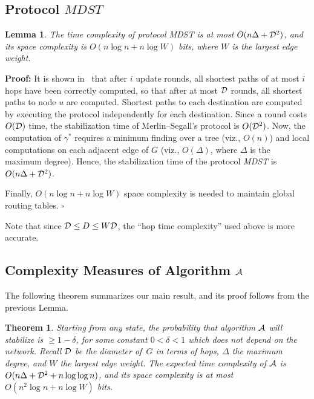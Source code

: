 \documentclass[10pt]{article}
\newtheorem{thm}{Theorem}[section]
\newtheorem{lemm}{Lemma}[section]
\newenvironment{proof}{\begin{trivlist}
                       \item[]\hspace{0cm}\textbf{Proof: }
                       \hspace{0cm} }{\hfill $\square$
                       \end{trivlist}}
\begin{document}
\subsection{Protocol $MDST$}\label{mdstcomp}

\begin{lemm}\label{lem:mdstc}
The time complexity of protocol MDST is at most
$O(n\Delta+{\cal D}^2)$, and its space complexity is
$O(n\log n + n\log W)$ bits, where $W$ is the largest edge weight.
\end{lemm}

\begin{proof}
It is shown in~\cite{MeSe79} that after $i$ update
rounds, all shortest paths of at most $i$ hops have been correctly
computed, so that after at most $\cal D$ rounds, all shortest paths to
node $u$ are computed.  Shortest paths to each destination are
computed by executing the protocol independently for each destination.
Since a round costs $O({\cal D})$ time, the stabilization time of
Merlin--Segall's protocol is $O({\cal D}^2)$.  Now, the computation of
$\gamma^*$ requires a minimum finding over a tree (viz., $O(n)$) and
local computations on each adjacent edge of $G$ (viz., $O(\Delta)$,
where $\Delta$ is the maximum degree). Hence, the stabilization time
of the protocol {\em MDST} is $O(n\Delta + {\cal D}^2)$.

Finally, $O(n\log n + n\log W)$ space complexity is needed to maintain
global routing tables.
\end{proof}
Note that since ${\cal D} \leq D \leq W {\cal D}$, the ``hop time complexity''
used above is more accurate.

\subsection{Complexity Measures of Algorithm $\cal A$}

The following theorem summarizes our main result, and its proof follows from
the previous Lemma.

\begin{thm}\label{thm:complex}
Starting from any state, the probability that algorithm $\cal A$ will
stabilize is $\geq 1-\delta$, for some constant $0<\delta <1$ which
does not depend on the network. Recall ${\cal D}$ be the diameter
of~$G$ in terms of hops, $\Delta$ the maximum degree, and $W$ the
largest edge weight. The expected time complexity of $\cal A$ is
$O(n\Delta + {\cal D}^2 + n \log\log n)$, and its space complexity is
at most $O(n^2\log n + n\log W)$ bits.
\end{thm}
\end{document}
